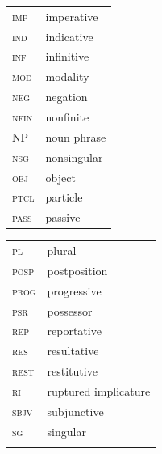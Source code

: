 \documentclass[output=paper,colorlinks,citecolor=brown,draft]{langscibook}
\begin{document}
\begin{tabularx}{.45\textwidth}{lQ}
\textsc{imp} & imperative\\ 
\textsc{ind} & indicative \\
\textsc{inf} & infinitive\\ 
\textsc{mod} & modality\\
\textsc{neg} & negation \\ 
\textsc{nfin} & nonfinite\\ 
NP & noun phrase\\ 
\textsc{nsg} & nonsingular\\ 
\textsc{obj} & object\\ 
\textsc{ptcl} & particle\\
\textsc{pass} & passive\\ 
\end{tabularx}
\begin{tabularx}{.45\textwidth}{lQ}
\textsc{pl} & plural\\ 
\textsc{posp} & postposition\\ 
\textsc{prog} & progressive\\ 
\textsc{psr} & possessor\\ 
\textsc{rep} & reportative\\
\textsc{res} & resultative \\ 
\textsc{rest} & restitutive\\ 
\textsc{ri} & ruptured implicature\\
\textsc{sbjv} & subjunctive \\ 
\textsc{sg} & singular\\ 
\\
\end{tabularx}

\sloppy\printbibliography[heading=subbibliography,notkeyword=this]
\end{document}
